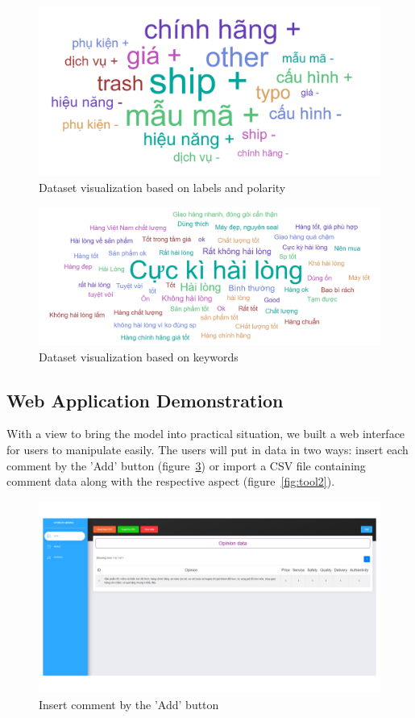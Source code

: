 \begin{figure}[h]
	\centering
	\includegraphics[width=\linewidth]{Chapter4/Figs/kibana1.png}
	\caption{Dataset visualization based on labels and polarity}
	\label{fig:label}
\end{figure}

\begin{figure}[h]
	\centering
	\includegraphics[width=\linewidth]{Chapter4/Figs/kibana2.png}
	\caption{Dataset visualization based on keywords}
	\label{fig:keyword}
\end{figure}

\subsection{Web Application Demonstration}
With a view to bring the model into practical situation, we built a web interface for users to manipulate easily.
The users will put in data in two ways: insert each comment by the 'Add' button (figure~\ref{fig:tool1}) or import a CSV file containing comment data along with the respective aspect (figure~\ref{fig:tool2}).

\begin{figure}[h]
	\centering
	\includegraphics[width=\linewidth]{Chapter4/Figs/tool1.png}
	\caption{Insert comment by the 'Add' button}
	\label{fig:tool1}
\end{figure}

